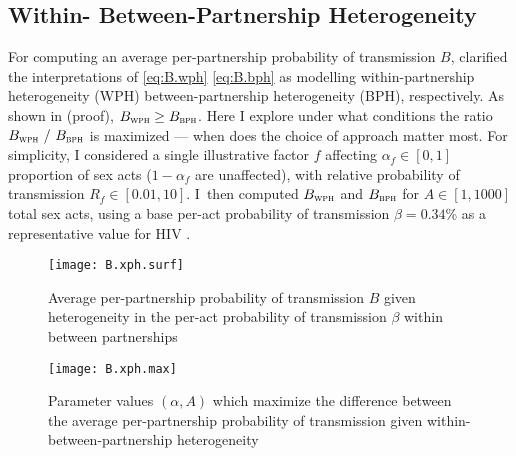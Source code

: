 \subsection{Within- \vs Between-Partnership Heterogeneity}\label{foi.exp.xph}
For computing an average per-partnership probability of transmission $B$,
 clarified the interpretations of
\eqref{eq:B.wph} \vs \eqref{eq:B.bph} as modelling
within-partnership heterogeneity (WPH) \vs between-partnership heterogeneity (BPH), respectively.
As shown in  (proof), $B_{\textsc{wph}} \ge B_{\textsc{bph}}$.
Here I explore under what conditions the ratio $B_{\textsc{wph}}~/~B_{\textsc{bph}}$ is maximized
--- \ie when does the choice of approach matter most.
For simplicity, I considered a single illustrative factor $f$
affecting $\alpha_f \in [0,1]$ proportion of sex acts ($1-\alpha_f$ are unaffected),
with relative probability of transmission $R_f \in [0.01,10]$.
I~then computed $B_{\textsc{wph}}$ and $B_{\textsc{bph}}$ for $A \in [1,1000]$ total sex acts,
using a base per-act probability of transmission $\beta = 0.34$\%
as a representative value for HIV \cite{Boily2009}.
\par
\begin{figure}
  \centering\texttt{[image: B.xph.surf]}
  \caption{Average per-partnership probability of transmission $B$
    given heterogeneity in the per-act probability of transmission $\beta$
    within \vs between partnerships}
  \label{fig:B.xph.surf}
\end{figure}
\begin{figure}
  \centering\texttt{[image: B.xph.max]}
  \caption{Parameter values $(\alpha,A)$ which maximize the difference between
    the average per-partnership probability of transmission
    given within- \vs between-partnership heterogeneity}
  \label{fig:B.xph.max}
\end{figure}
